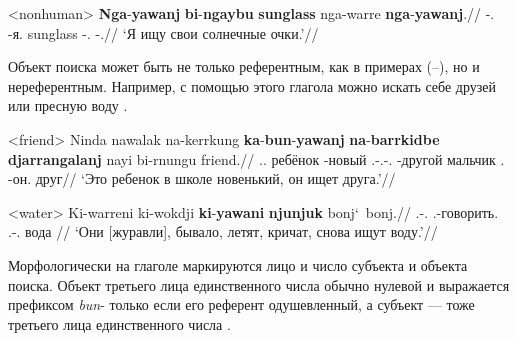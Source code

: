 \ex<nonhuman> \begingl
\gla \textbf{Nga}-\textbf{yawanj} \textbf{bi}-\textbf{ngaybu} \textbf{sunglass} nga-warre \textbf{nga}-\textbf{yawanj}.//
\glb \nga-\yaw.\Np{} \bi-я.\Gen{} sunglass \nga-\warre.\Np{} \nga-\yaw.\Np{}//
\glft `Я ищу свои солнечные очки.'//%
\endgl \xe

Объект поиска может быть не только референтным, как в примерах (--), но и нереферентным. Например, с помощью этого глагола можно искать себе друзей  или пресную воду .

\ex<friend> \begingl
\gla Ninda nawalak na-kerrkung \textbf{ka}-\textbf{bun}-\textbf{yawanj} \textbf{na}-\textbf{barrkidbe} \textbf{djarrangalanj} nayi bi-rnungu friend.//
\glb \Dem.\Prox.\Cli{} ребёнок \Cli-новый \Tsg.\Real-\Tsg.\Obj-\yaw.\Np{} \Cli-другой мальчик \Nm.\Cli{} \bi-он.\Gen{} друг//
\glft `Это ребенок в школе новенький, он ищет друга.'//%
\endgl \xe

\ex<water>\begingl
\gla Ki-warreni ki-wokdji \textbf{ki}-\textbf{yawani} \textbf{njunjuk} bonj\char`~bonj.//
\glb \Tsg.\irrpst-\warre.\irrpst{} \Tsg.\irrpst-говорить.\irrpst{} \Tsg.\irrpst-\yaw.\irrpst{} вода \rdp\bonj{}//
\glft `Они [журавли], бывало, летят, кричат, снова ищут воду.'//%
\endgl \xe

Морфологически на глаголе маркируются лицо и число субъекта и объекта поиска. Объект третьего лица единственного числа обычно нулевой и выражается префиксом \textit{bun}- только если его референт одушевленный, а субъект --- тоже третьего лица единственного числа .


